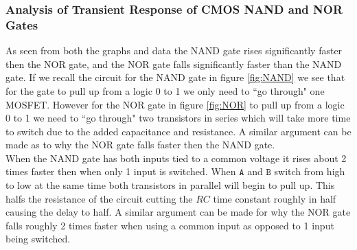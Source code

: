 \documentclass[titlepage, 12pt]{article}
\newcommand\sA{\ensuremath{\mathtt{A}}}
\newcommand\sB{\ensuremath{\mathtt{B}}}
\begin{document}
    \subsubsection{Analysis of Transient Response of CMOS NAND and NOR
    Gates}
    As seen from both the graphs and data the NAND gate rises
    significantly faster then the NOR gate, and the NOR gate falls
    significantly faster than the NAND gate. If we recall the circuit
    for the NAND gate in figure \ref{fig:NAND} we see that for the gate
    to pull up from a logic 0 to 1 we only need to ``go through" one
    MOSFET. However for the NOR gate in figure \ref{fig:NOR} to pull up
    from a logic 0 to 1 we need to ``go through" two transistors in
    series which will take more time to switch due to the added
    capacitance and resistance. A similar argument can be made as to why
    the NOR gate falls faster then the NAND gate.\\

    When the NAND gate has both inputs tied to a common voltage it rises
    about 2 times faster then when only 1 input is switched. When $\sA$
    and $\sB$ switch from high to low at the same time both transistors
    in parallel will begin to pull up. This halfs the resistance of the
    circuit cutting the $RC$ time constant roughly in half causing the
    delay to half. A similar argument can be made for why the NOR gate
    falls roughly 2 times faster when using a common input as opposed to
    1 input being switched.

    \pagebreak
\end{document}
